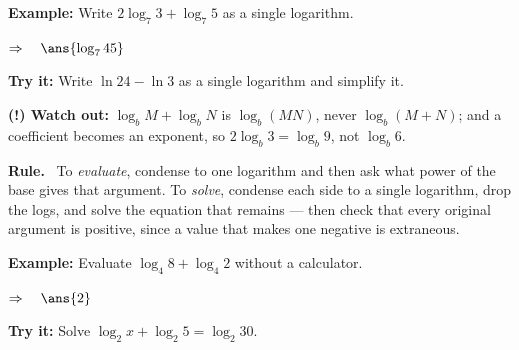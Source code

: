 \documentclass[12pt]{article}
\begin{document}
\begin{examplebox}
\textbf{Example:} \quad Write $2\log_7 3 + \log_7 5$ as a single logarithm.


$\Rightarrow\quad \ans{\log_7 45}$
\end{examplebox}

\begin{tryitbox}
\textbf{Try it:} \quad Write $\ln 24 - \ln 3$ as a single logarithm and simplify it.\\[2pt]
\end{tryitbox}

\begin{watchoutbox}
\textbf{(!) Watch out:} $\log_b M + \log_b N$ is $\log_b(MN)$, never $\log_b(M + N)$; and a coefficient becomes an exponent, so $2\log_b 3 = \log_b 9$, not $\log_b 6$.
\end{watchoutbox}


\begin{formulabox}
\textbf{Rule.} \ To \emph{evaluate}, condense to one logarithm and then ask what power of the base gives that argument. To \emph{solve}, condense each side to a single logarithm, drop the logs, and solve the equation that remains --- then check that every original argument is positive, since a value that makes one negative is extraneous.
\end{formulabox}

\begin{examplebox}
\textbf{Example:} \quad Evaluate $\log_4 8 + \log_4 2$ without a calculator.


$\Rightarrow\quad \ans{2}$
\end{examplebox}

\begin{tryitbox}
\textbf{Try it:} \quad Solve $\log_2 x + \log_2 5 = \log_2 30$.\\[2pt]
\end{tryitbox}
\end{document}
